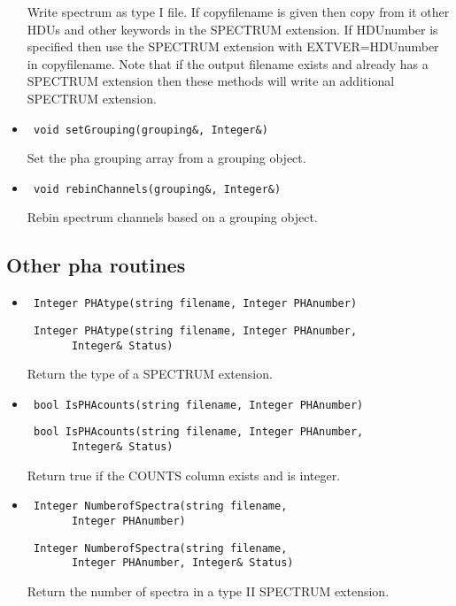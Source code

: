 \documentclass[11pt]{book}
\begin{document}
\begin{itemize}
          Write spectrum as type I file. If copyfilename is given then
          copy from it other HDUs and other keywords in the SPECTRUM
          extension. If HDUnumber is specified then use the SPECTRUM
          extension with EXTVER=HDUnumber in copyfilename. Note that 
          if the output filename exists and already has a SPECTRUM 
          extension then these methods will write an
          additional SPECTRUM extension.

\item  \begin{verbatim} void setGrouping(grouping&, Integer&) \end{verbatim}

           Set the pha grouping array from a grouping object.

\item  \begin{verbatim} void rebinChannels(grouping&, Integer&) \end{verbatim}

           Rebin spectrum channels based on a grouping object.

\end{itemize}

\subsection{Other pha routines}

\begin{itemize}

\item  \begin{verbatim} Integer PHAtype(string filename, Integer PHAnumber) \end{verbatim}
       \begin{verbatim} Integer PHAtype(string filename, Integer PHAnumber, 
       Integer& Status) \end{verbatim}

          Return the type of a SPECTRUM extension.

\item  \begin{verbatim} bool IsPHAcounts(string filename, Integer PHAnumber) \end{verbatim}
       \begin{verbatim} bool IsPHAcounts(string filename, Integer PHAnumber, 
       Integer& Status) \end{verbatim}

          Return true if the COUNTS column exists and is integer.

\item  \begin{verbatim} Integer NumberofSpectra(string filename, 
       Integer PHAnumber) \end{verbatim}
       \begin{verbatim} Integer NumberofSpectra(string filename, 
       Integer PHAnumber, Integer& Status) \end{verbatim}

          Return the number of spectra in a type II SPECTRUM extension.

\end{itemize}
\end{document}
